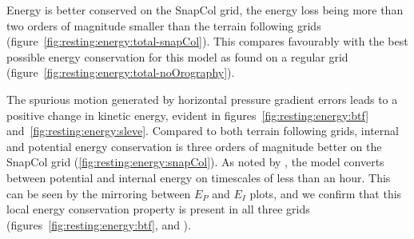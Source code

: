 Energy is better conserved on the SnapCol grid, the energy loss being more than two orders of magnitude smaller than the terrain following grids (figure~\ref{fig:resting:energy:total-snapCol}).  This compares favourably with the best possible energy conservation for this model as found on a regular grid (figure~\ref{fig:resting:energy:total-noOrography}).

The spurious motion generated by horizontal pressure gradient errors leads to a positive change in kinetic energy, evident in figures~\ref{fig:resting:energy:btf} and~\ref{fig:resting:energy:sleve}.  Compared to both terrain following grids, internal and potential energy conservation is three orders of magnitude better on the SnapCol grid (\ref{fig:resting:energy:snapCol}).  As noted by \textcite{weller-shahrokhi2014}, the model converts between potential and internal energy on timescales of less than an hour.  This can be seen by the mirroring between $E_P$ and $E_I$ plots, and we confirm that this local energy conservation property is present in all three grids (figures~\ref{fig:resting:energy:btf},  and ).

